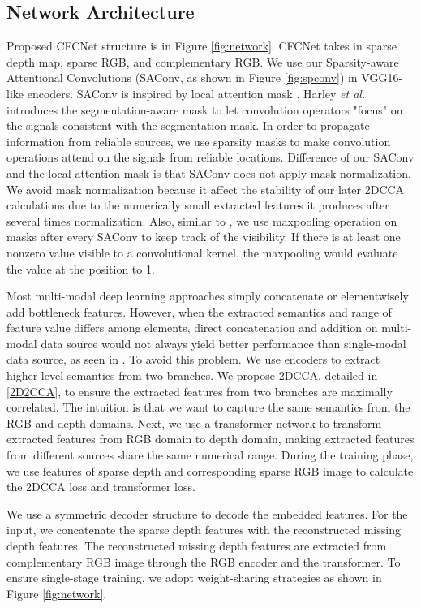 \documentclass{article}
\begin{document}
\subsection{Network Architecture}
\label{Network}
Proposed CFCNet structure is in Figure \ref{fig:network}. CFCNet takes in sparse depth map, sparse RGB, and complementary RGB. We use our Sparsity-aware Attentional Convolutions (SAConv, as shown in Figure \ref{fig:spconv}) in VGG16-like encoders. SAConv is inspired by local attention mask \cite{harley_segaware}. Harley \textit{et al.} \cite{harley_segaware} introduces the segmentation-aware mask to let convolution operators "focus" on the signals consistent with the segmentation mask. In order to propagate information from reliable sources, we use sparsity masks to make convolution operations attend on the signals from reliable locations. Difference of our SAConv and the local attention mask is that SAConv does not apply mask normalization. We avoid mask normalization because it affect the stability of our later 2DCCA calculations due to the numerically small extracted features it produces after several times normalization. Also, similar to \cite{uhrig2017sparsity}, we use maxpooling operation on masks after every SAConv to keep track of the visibility. If there is at least one nonzero value visible to a convolutional kernel, the maxpooling would evaluate the value at the position to 1.

Most multi-modal deep learning approaches simply concatenate or elementwisely add bottleneck features. However, when the extracted semantics and range of feature value differs among elements, direct concatenation and addition on multi-modal data source would not always yield better performance than single-modal data source, as seen in \cite{ngiam2011multimodal, Jaritz_2018}. To avoid this problem. We use encoders to extract higher-level semantics from two branches. We propose 2DCCA, detailed in \ref{2D2CCA}, to ensure the extracted features from two branches are maximally correlated. The intuition is that we want to capture the same semantics from the RGB and depth domains. Next, we use a transformer network to transform extracted features from RGB domain to depth domain, making extracted features from different sources share the same numerical range. During the training phase, we use features of sparse depth and corresponding sparse RGB image to calculate the 2DCCA loss and transformer loss.

We use a symmetric decoder structure to decode the embedded features. For the input, we concatenate the sparse depth features with the reconstructed missing depth features. The reconstructed missing depth features are extracted from complementary RGB image through the RGB encoder and the transformer. To ensure single-stage training, we adopt weight-sharing strategies as shown in Figure \ref{fig:network}.
\end{document}
